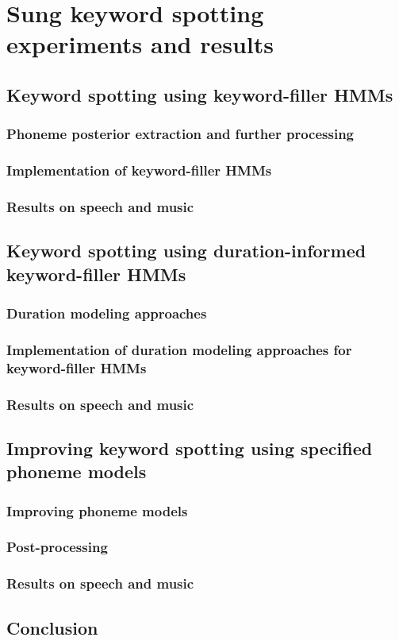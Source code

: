 \chapter{Sung keyword spotting experiments and results} \label{chap:kws}
\section{Keyword spotting using keyword-filler HMMs}
\subsection{Phoneme posterior extraction and further processing}
\subsection{Implementation of keyword-filler HMMs}
\subsection{Results on speech and music}
\section{Keyword spotting using duration-informed keyword-filler HMMs}
\subsection{Duration modeling approaches}
\subsection{Implementation of duration modeling approaches for keyword-filler HMMs}
\subsection{Results on speech and music}
\section{Improving keyword spotting using specified phoneme models}
\subsection{Improving phoneme models}
\subsection{Post-processing}
\subsection{Results on speech and music}
\section{Conclusion}